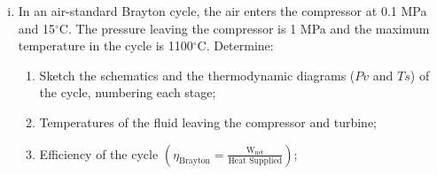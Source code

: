 \documentclass[calculator,steamtables,refrigeranttables,psychrometricchart,datasheet]{exam}
\newcommand{\frc}{\displaystyle\frac}
\begin{document}
\begin{question}
\begin{enumerate}[(i)]
\item In an air-standard Brayton cycle, the air enters the compressor at 0.1 MPa and 15$^{\circ}$C. The pressure leaving the compressor is 1 MPa and the maximum temperature in the cycle is 1100$^{\circ}$C. Determine:
\begin{enumerate}
\item Sketch the schematics and the thermodynamic diagrams ($Pv$ and $Ts$) of the cycle, numbering each stage;~
%
\item Temperatures of the fluid leaving the compressor and turbine;~
%
\item Efficiency of the cycle $\left(\eta_{\text{Brayton}}=\frc{\text{W}_{\text{net}}}{\text{Heat Supplied}}\right)$;~

\end{enumerate}
\end{enumerate}
\end{question}
\end{document}
